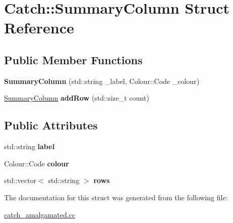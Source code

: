 \hypertarget{structCatch_1_1SummaryColumn}{}\section{Catch\+:\+:Summary\+Column Struct Reference}
\label{structCatch_1_1SummaryColumn}
\subsection*{Public Member Functions}
\begin{DoxyCompactItemize}
\item 
\mbox{\label{structCatch_1_1SummaryColumn_a5ccb6d3a534033e95fe8624494a5330b}} 
{\bfseries Summary\+Column} (std\+::string \+\_\+label, Colour\+::\+Code \+\_\+colour)
\item 
\mbox{\label{structCatch_1_1SummaryColumn_aed5c921b3ad08f653d879280be435d1a}} 
\hyperlink{structCatch_1_1SummaryColumn}{Summary\+Column} {\bfseries add\+Row} (std\+::size\+\_\+t count)
\end{DoxyCompactItemize}
\subsection*{Public Attributes}
\begin{DoxyCompactItemize}
\item 
\mbox{\label{structCatch_1_1SummaryColumn_a01f1eaae714a8f53494ad6e0926a1157}} 
std\+::string {\bfseries label}
\item 
\mbox{\label{structCatch_1_1SummaryColumn_adeb1eac3b0eda3b653c9063a2fe521d7}} 
Colour\+::\+Code {\bfseries colour}
\item 
\mbox{\label{structCatch_1_1SummaryColumn_ad0f54e7422f5773b03e96d0019915f8d}} 
std\+::vector$<$ std\+::string $>$ {\bfseries rows}
\end{DoxyCompactItemize}


The documentation for this struct was generated from the following file\+:\begin{DoxyCompactItemize}
\item 
\hyperlink{catch__amalgamated_8cc}{catch\+\_\+amalgamated.\+cc}\end{DoxyCompactItemize}

